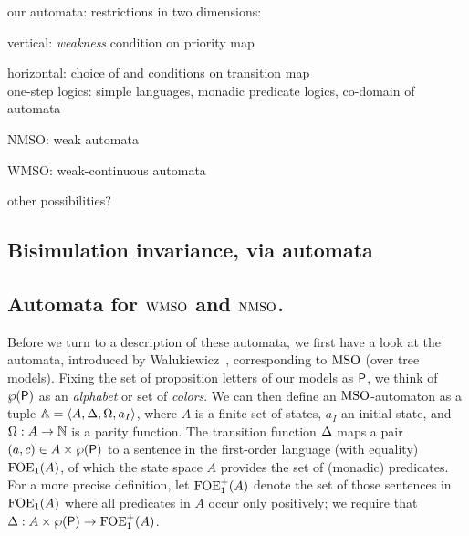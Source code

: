 \item
our automata: restrictions in two dimensions:
  \btbs
  \item
  vertical: \emph{weakness} condition on priority map
  \item
  horizontal: choice of and conditions on transition map
  \\
  one-step logics: simple languages, monadic predicate logics, 
  co-domain of automata
  \etbs
\item
NMSO: weak automata
\item
WMSO: weak-continuous automata
\item
other possibilities?
\etbs

\subsection{Bisimulation invariance, via automata}


\newpage


\subsection{Automata for $\mathrm{WMSO}$ and $\mathrm{NMSO}$.}
%

Before we turn to a description of these automata, we first have a look at the
automata, introduced by Walukiewicz~\cite{Walukiewicz96}, corresponding to $\mathrm{MSO}$
(over tree models).
Fixing the set of proposition letters of our models as $\mathsf{P}$, we think of
$\wp(\mathsf{P})$ as an \emph{alphabet} or set of \emph{colors}.
We can then define an $\mathrm{MSO}$-automaton as a tuple $\mathbb{A} = 
\langle{A,\Delta,\Omega,a_I}\rangle$, where $A$ is a finite set of states, $a_I$ an initial state, and $\Omega:
A \to \mathbb{N}$ is a parity function.
%
The transition function $\Delta$ maps a pair $(a,c) \in A \times \wp(\mathsf{P})$ to a
sentence in the first-order language (with equality) $\mathrm{FOE}_1(A)$, of which the
state space $A$ provides the set of (monadic) predicates.
%
For a more precise definition, let $\mathrm{FOE}_1^+(A)$ denote the set of
those sentences in $\mathrm{FOE}_1(A)$ where all predicates in $A$ occur only positively;
we require that $\Delta: A \times \wp(\mathsf{P}) \to \mathrm{FOE}_1^+(A)$.

